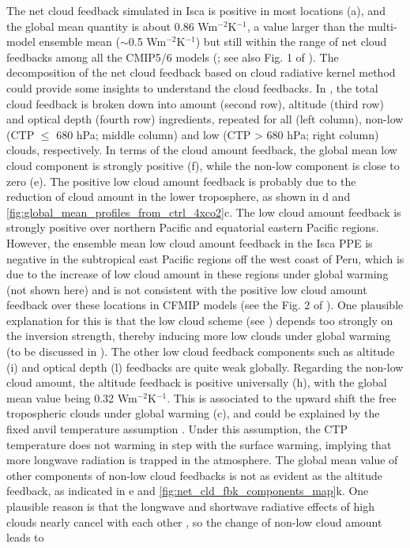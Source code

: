 The net cloud feedback simulated in Isca is positive in most locations (a), and the global mean quantity is about 0.86 Wm$^{-2}$K$^{-1}$, a value larger than the multi-model ensemble mean ($\sim$0.5 Wm$^{-2}$K$^{-1}$) but still within the range of net cloud feedbacks among all the CMIP5/6 models (; see also Fig. 1 of \citealt{Zelinka2020causes}). The decomposition of the net cloud feedback based on cloud radiative kernel method could provide some insights to understand the cloud feedbacks. In , the total cloud feedback is broken down into amount (second row), altitude (third row) and optical depth (fourth row) ingredients, repeated for all (left column), non-low (CTP $\le$ 680 hPa; middle column) and low (CTP > 680 hPa; right column) clouds, respectively. In terms of the cloud amount feedback, the global mean low cloud component is strongly positive (f), while the non-low component is close to zero (e). The positive low cloud amount feedback is probably due to the reduction of cloud amount in the lower troposphere, as shown in d and  \ref{fig:global_mean_profiles_from_ctrl_4xco2}c. The low cloud amount feedback is strongly positive over northern Pacific and equatorial eastern Pacific regions. However, the ensemble mean low cloud amount feedback in the Isca PPE is negative in the subtropical east Pacific regions off the west coast of Peru, which is due to the increase of low cloud amount in these regions under global warming (not shown here) and is not consistent with the positive low cloud amount feedback over these locations in CFMIP models (see the Fig. 2 of \citealt{Zelinka2016insights}). One plausible explanation for this is that the low cloud scheme (see ) depends too strongly on the inversion strength, thereby inducing more low clouds under global warming (to be discussed in ). The other low cloud feedback components such as altitude (i) and optical depth (l) feedbacks are quite weak globally. Regarding the non-low cloud amount, the altitude feedback is positive universally (h), with the global mean value being 0.32 Wm$^{-2}$K$^{-1}$. This is associated to the upward shift the free tropospheric clouds under global warming (c), and could be explained by the fixed anvil temperature assumption \citep[e.g.,][]{Hartmann2002FAT, Ceppi2017}. Under this assumption, the CTP temperature does not warming in step with the surface warming, implying that more longwave radiation is trapped in the atmosphere. The global mean value of other components of non-low cloud feedbacks is not as evident as the altitude feedback, as indicated in e and \ref{fig:net_cld_fbk_components_map}k. One plausible reason is that the longwave and shortwave radiative effects of high clouds nearly cancel with each other \citep{Kiehl1994observed}, so the change of non-low cloud amount leads to 